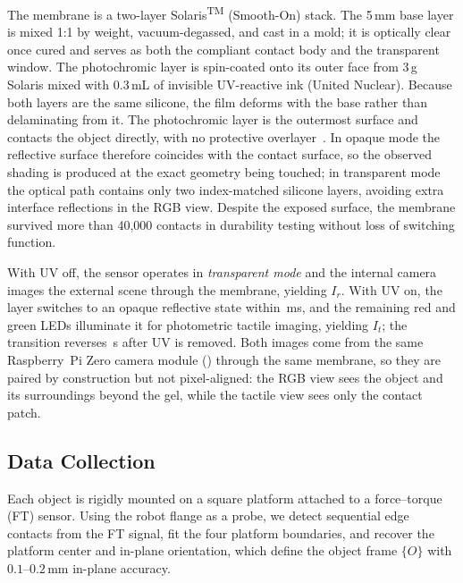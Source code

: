 The membrane is a two-layer Solaris\textsuperscript{TM} (Smooth-On) stack.
The 5\,mm base layer is mixed 1:1 by weight, vacuum-degassed, and cast in a
mold; it is optically clear once cured and serves as both the compliant
contact body and the transparent window.
The photochromic layer is spin-coated onto its outer face from 3\,g Solaris
mixed with 0.3\,mL of invisible UV-reactive ink (United Nuclear).
Because both layers are the same silicone, the film deforms with the base
rather than delaminating from it.
The photochromic layer is the outermost surface and contacts the object
directly, with no protective overlayer~\cite{prince2026mvptac}.
In opaque mode the reflective surface therefore coincides with the contact
surface, so the observed shading is produced at the exact geometry being
touched; in transparent mode the optical path contains only two
index-matched silicone layers, avoiding extra interface reflections in the
RGB view.
Despite the exposed surface, the membrane survived more than 40{,}000
contacts in durability testing without loss of switching function.

With UV off, the sensor operates in \emph{transparent mode} and the internal
camera images the external scene through the membrane, yielding $I_r$.
With UV on, the layer switches to an opaque reflective state within
\,ms, and the remaining red and green LEDs illuminate it for
photometric tactile imaging, yielding $I_t$; the transition reverses
\,s after UV is removed.
Both images come from the same Raspberry~Pi Zero camera module
() through the same membrane, so they are paired by
construction but not pixel-aligned: the RGB view sees the object and its
surroundings beyond the gel, while the tactile view sees only the contact
patch.

\subsection{Data Collection}
\label{sec:data_collection}

Each object is rigidly mounted on a square platform attached to a
force--torque (FT) sensor.
Using the robot flange as a probe, we detect sequential edge contacts from
the FT signal, fit the four platform boundaries, and recover the platform
center and in-plane orientation, which define the object frame $\{O\}$ with
$0.1$--$0.2\,$mm in-plane accuracy.


